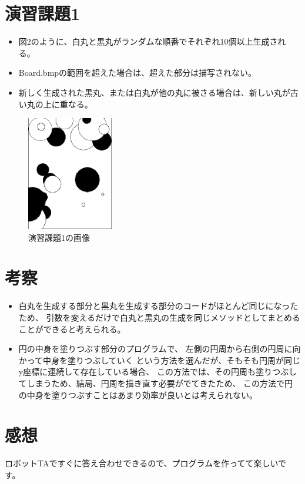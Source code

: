 \documentclass{jsarticle}
\begin{document}

\section{演習課題1}
\begin{itemize}
  \item 図2のように、白丸と黒丸がランダムな順番でそれぞれ10個以上生成される。
  \item Board.bmpの範囲を超えた場合は、超えた部分は描写されない。
  \item 新しく生成された黒丸、または白丸が他の丸に被さる場合は、新しい丸が古い丸の上に重なる。
\end{itemize}
\begin{figure}[h]
\begin{center}
\includegraphics[height=5cm,clip]{Report1.eps}
\caption{演習課題1の画像}
\label{fig:2}
\end{center}
\end{figure}

\section{考察}
\begin{itemize}
\item 白丸を生成する部分と黒丸を生成する部分のコードがほとんど同じになったため、
引数を変えるだけで白丸と黒丸の生成を同じメソッドとしてまとめることができると考えられる。
\item 円の中身を塗りつぶす部分のプログラムで、
左側の円周から右側の円周に向かって中身を塗りつぶしていく
という方法を選んだが、そもそも円周が同じy座標に連続して存在している場合、
この方法では、その円周も塗りつぶしてしまうため、結局、円周を描き直す必要がでてきたため、
この方法で円の中身を塗りつぶすことはあまり効率が良いとは考えられない。
\end{itemize}

\section{感想}
ロボットTAですぐに答え合わせできるので、プログラムを作ってて楽しいです。
\end{document}
